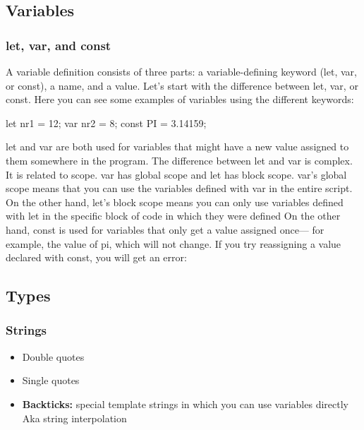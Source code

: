\documentclass{report}
\begin{document}
    \pagebreak 
    \bigbreak \noindent 
    \subsection{Variables}
    \bigbreak \noindent 
    \subsubsection{let, var, and const}
    \bigbreak \noindent 
    A variable definition consists of three parts: a variable-defining keyword (let, var, or const), a name, and a value. Let's start with the difference between let, var, or const. Here you can see some examples of variables using the different keywords:
    \bigbreak \noindent 
    \begin{jscode}
        let nr1 = 12;
        var nr2 = 8;
        const PI = 3.14159;
    \end{jscode}
    \bigbreak \noindent 
    let and var are both used for variables that might have a new value assigned to them somewhere in the program. The difference between let and var is complex. It is related to scope.
    \bigbreak \noindent 
    var has global scope and let has block scope. var's global scope means that you can use the variables defined with var in the entire script. On the other hand, let's block scope means you can only use variables defined with let in the specific block of code in which they were defined
    \bigbreak \noindent 
    On the other hand, const is used for variables that only get a value assigned once— for example, the value of pi, which will not change. If you try reassigning a value declared with const, you will get an error:

    \bigbreak \noindent 
    \subsection{Types}
    \bigbreak \noindent 
    \subsubsection{Strings}
    \bigbreak \noindent 
    \begin{itemize}
        \item Double quotes
        \item Single quotes
        \item \textbf{Backticks:} special template strings in which you can use variables directly
            \bigbreak \noindent 
            Aka string interpolation
            \bigbreak \noindent 
    \end{itemize}
\end{document}
